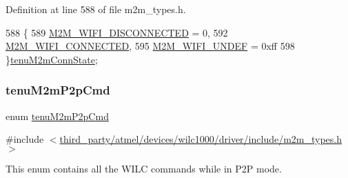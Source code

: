 Definition at line 588 of file m2m\+\_\+types.\+h.


\begin{DoxyCode}
588              \{
589     \hyperlink{group__WlanEnums_gga460c311f58f4c40c3d20eec9e99db586a0c24dd073c9dde02e789858e161f7106}{M2M\_WIFI\_DISCONNECTED} = 0,
592     \hyperlink{group__WlanEnums_gga460c311f58f4c40c3d20eec9e99db586a9196649c19ee10e2168e08a5b4785938}{M2M\_WIFI\_CONNECTED},
595     \hyperlink{group__WlanEnums_gga460c311f58f4c40c3d20eec9e99db586a293d56dfae465cd602778ff3a7f684b4}{M2M\_WIFI\_UNDEF} = 0xff
598 \}\hyperlink{group__WlanEnums_ga460c311f58f4c40c3d20eec9e99db586}{tenuM2mConnState};
\end{DoxyCode}
\mbox{\label{group__WlanEnums_gac07a15ce7dd9a5508a5cff22ce91f65c}} 
\subsubsection{\texorpdfstring{tenu\+M2m\+P2p\+Cmd}{tenuM2mP2pCmd}}
{\footnotesize\ttfamily enum \hyperlink{group__WlanEnums_gac07a15ce7dd9a5508a5cff22ce91f65c}{tenu\+M2m\+P2p\+Cmd}}



{\ttfamily \#include $<$\hyperlink{m2m__types_8h}{third\+\_\+party/atmel/devices/wilc1000/driver/include/m2m\+\_\+types.\+h}$>$}



This enum contains all the W\+I\+LC commands while in P2P mode. 

